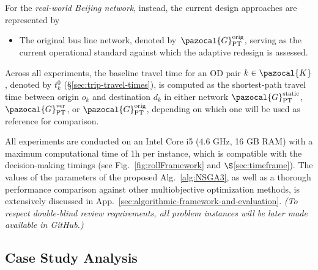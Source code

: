 \documentclass[a4paper,fleqn]{cas-sc}
\begin{document}
For the \emph{real-world Beijing network}, instead, the current design approaches are represented by
\begin{itemize}
\item The original bus line network, denoted by~$\pazocal{G}_{\text{PT}}^{\text{orig}}$, serving as the current operational standard against which the adaptive redesign is assessed.
\end{itemize}
%
Across all experiments, the baseline travel time for an OD pair $k \in \pazocal{K}$, denoted by $t_k^0$ (\S{}\ref{sec:trip-travel-times}), is computed as the shortest-path travel time between origin $o_k$ and destination $d_k$ in either network $\pazocal{G}_{\text{PT}}^{\text{static}}$, $\pazocal{G}_{\text{PT}}^{\text{ver}}$, or $\pazocal{G}_{\text{PT}}^{\text{orig}}$, depending on which one will be used as reference for comparison.



All experiments are conducted on an Intel Core i5 (4.6 GHz, 16 GB RAM) with a maximum computational time of 1h per instance, which is compatible with the decision-making timings (see Fig.~\ref{fig:rollFramework} and $\S$\ref{sec:timeframe}). 
The values of the parameters of the proposed Alg.~\ref{alg:NSGA3}, as well as a thorough performance comparison against other multiobjective optimization methods, is extensively discussed in App.~\ref{sec:algorithmic-framework-and-evaluation}.
%
\textit{(To respect double-blind review requirements, all problem instances will be later made available in GitHub.)}




\subsection{Case Study Analysis}\label{sec:caseStudy}
\end{document}
